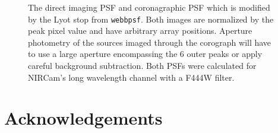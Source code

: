 \documentclass{aastex6}
\begin{document}
\begin{figure}
\centering
{}
	\caption{The direct imaging PSF and coronagraphic PSF which is modified by the Lyot stop from \texttt{webbpsf}. Both images are normalized by the peak pixel value and have arbitrary array positions. Aperture photometry of the sources imaged through the corograph will have to use a large aperture encompassing the 6 outer peaks or apply careful background subtraction. Both PSFs were calculated for NIRCam's long wavelength channel with a F444W filter.}
	\label{fig:psfComparison}
\end{figure} 

\section*{Acknowledgements}
\end{document}
